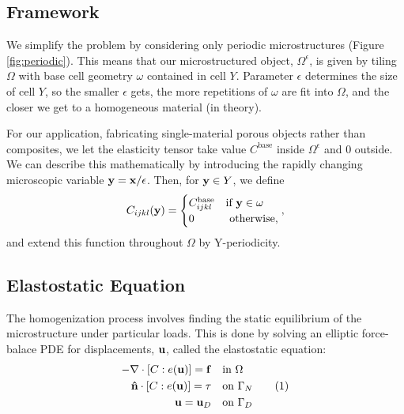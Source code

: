 \documentclass[10pt]{article}
\providecommand{\e}{\epsilon}
\newcommand\numberthis{\addtocounter{equation}{1}\tag{\theequation}}
\begin{document}
\subsection{Framework}
We simplify the problem by considering only periodic microstructures (Figure
\ref{fig:periodic}). This means that our microstructured object, $\Omega^\e$,
is given by tiling $\Omega$ with base cell geometry $\omega$ contained in cell $Y$.
Parameter $\epsilon$ determines the size of cell $Y$, so the smaller $\epsilon$
gets, the more repetitions of $\omega$ are fit into $\Omega$, and the closer we
get to a homogeneous material (in theory).

For our application, fabricating single-material porous objects rather
than composites, we let the elasticity tensor take value $C^\text{base}$ inside
$\Omega^\e$ and $0$ outside. We can describe this mathematically by introducing
the rapidly changing microscopic variable ${\bf y} = {\bf x} / \epsilon$. Then,
for ${\bf y} \in Y$, we define
$$
C_{ijkl} ({\bf y}) = \begin{cases} C_{ijkl}^\text{base} & \text{if } {\bf y} \in \omega \\
                                 0 & \text{ otherwise,} \end{cases},
$$
and extend this function throughout $\Omega$ by Y-periodicity.

\subsection{Elastostatic Equation}
The homogenization process involves finding the static equilibrium of the
microstructure under particular loads. This is done by solving an
elliptic force-balace PDE for displacements, ${\bf u}$, called the elastostatic
equation:
\begin{align*}
    -\nabla \cdot [C : e({\bf u})] = {\bf f} \quad &\text{in } \Omega \\
    {\bf \hat{n}} \cdot [C : e({\bf u})] = {\bf \tau} \quad &\text{on } \Gamma_N \numberthis \label{eqn:elastostatic} \\
    {\bf u} = {\bf u}_D \quad &\text{on } \Gamma_D
\end{align*}
 
\end{document}
